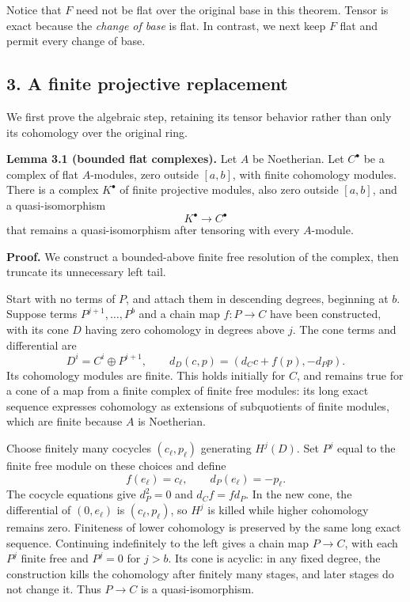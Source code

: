 \documentclass[11pt]{article}
\begin{document}
Notice that \(F\) need not be flat over the original base in this
theorem. Tensor is exact because the \emph{change of base} is flat. In
contrast, we next keep \(F\) flat and permit every change of base.

\subsection{3. A finite projective
replacement}\label{a-finite-projective-replacement}

We first prove the algebraic step, retaining its tensor behavior rather
than only its cohomology over the original ring.

\textbf{Lemma 3.1 (bounded flat complexes).} Let \(A\) be Noetherian.
Let \(C^\bullet\) be a complex of flat \(A\)-modules, zero outside
\([a,b]\), with finite cohomology modules. There is a complex
\(K^\bullet\) of finite projective modules, also zero outside \([a,b]\),
and a quasi-isomorphism \[
K^\bullet\longrightarrow C^\bullet
\] that remains a quasi-isomorphism after tensoring with every
\(A\)-module.

\textbf{Proof.} We construct a bounded-above finite free resolution of
the complex, then truncate its unnecessary left tail.

Start with no terms of \(P\), and attach them in descending degrees,
beginning at \(b\). Suppose terms \(P^{j+1},\ldots,P^b\) and a chain map
\(f:P\to C\) have been constructed, with its cone \(D\) having zero
cohomology in degrees above \(j\). The cone terms and differential are
\[
D^i=C^i\oplus P^{i+1},\qquad d_D(c,p)=(d_Cc+f(p),-d_Pp).
\] Its cohomology modules are finite. This holds initially for \(C\),
and remains true for a cone of a map from a finite complex of finite
free modules: its long exact sequence expresses cohomology as extensions
of subquotients of finite modules, which are finite because \(A\) is
Noetherian.

Choose finitely many cocycles \((c_\ell,p_\ell)\) generating \(H^j(D)\).
Set \(P^j\) equal to the finite free module on these choices and define
\[
f(e_\ell)=c_\ell,\qquad d_P(e_\ell)=-p_\ell.
\] The cocycle equations give \(d_P^2=0\) and \(d_Cf=fd_P\). In the new
cone, the differential of \((0,e_\ell)\) is \((c_\ell,p_\ell)\), so
\(H^j\) is killed while higher cohomology remains zero. Finiteness of
lower cohomology is preserved by the same long exact sequence.
Continuing indefinitely to the left gives a chain map \(P\to C\), with
each \(P^j\) finite free and \(P^j=0\) for \(j>b\). Its cone is acyclic:
in any fixed degree, the construction kills the cohomology after
finitely many stages, and later stages do not change it. Thus \(P\to C\)
is a quasi-isomorphism.
\end{document}
